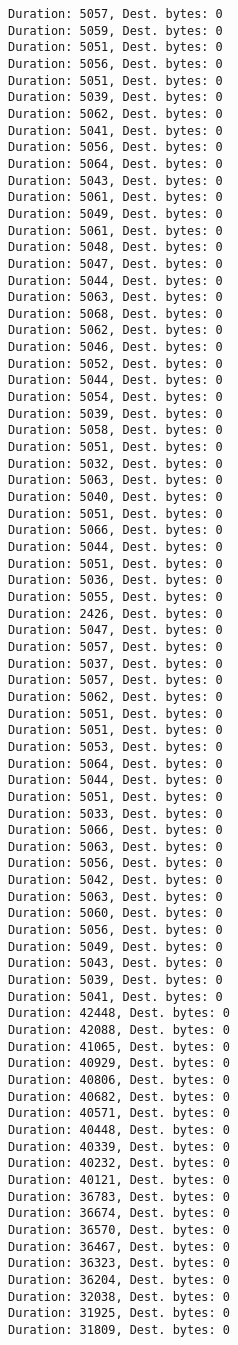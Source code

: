 \documentclass[11pt]{article}
\begin{document}
    \begin{Verbatim}[commandchars=\\\{\}]
Duration: 5057, Dest. bytes: 0
Duration: 5059, Dest. bytes: 0
Duration: 5051, Dest. bytes: 0
Duration: 5056, Dest. bytes: 0
Duration: 5051, Dest. bytes: 0
Duration: 5039, Dest. bytes: 0
Duration: 5062, Dest. bytes: 0
Duration: 5041, Dest. bytes: 0
Duration: 5056, Dest. bytes: 0
Duration: 5064, Dest. bytes: 0
Duration: 5043, Dest. bytes: 0
Duration: 5061, Dest. bytes: 0
Duration: 5049, Dest. bytes: 0
Duration: 5061, Dest. bytes: 0
Duration: 5048, Dest. bytes: 0
Duration: 5047, Dest. bytes: 0
Duration: 5044, Dest. bytes: 0
Duration: 5063, Dest. bytes: 0
Duration: 5068, Dest. bytes: 0
Duration: 5062, Dest. bytes: 0
Duration: 5046, Dest. bytes: 0
Duration: 5052, Dest. bytes: 0
Duration: 5044, Dest. bytes: 0
Duration: 5054, Dest. bytes: 0
Duration: 5039, Dest. bytes: 0
Duration: 5058, Dest. bytes: 0
Duration: 5051, Dest. bytes: 0
Duration: 5032, Dest. bytes: 0
Duration: 5063, Dest. bytes: 0
Duration: 5040, Dest. bytes: 0
Duration: 5051, Dest. bytes: 0
Duration: 5066, Dest. bytes: 0
Duration: 5044, Dest. bytes: 0
Duration: 5051, Dest. bytes: 0
Duration: 5036, Dest. bytes: 0
Duration: 5055, Dest. bytes: 0
Duration: 2426, Dest. bytes: 0
Duration: 5047, Dest. bytes: 0
Duration: 5057, Dest. bytes: 0
Duration: 5037, Dest. bytes: 0
Duration: 5057, Dest. bytes: 0
Duration: 5062, Dest. bytes: 0
Duration: 5051, Dest. bytes: 0
Duration: 5051, Dest. bytes: 0
Duration: 5053, Dest. bytes: 0
Duration: 5064, Dest. bytes: 0
Duration: 5044, Dest. bytes: 0
Duration: 5051, Dest. bytes: 0
Duration: 5033, Dest. bytes: 0
Duration: 5066, Dest. bytes: 0
Duration: 5063, Dest. bytes: 0
Duration: 5056, Dest. bytes: 0
Duration: 5042, Dest. bytes: 0
Duration: 5063, Dest. bytes: 0
Duration: 5060, Dest. bytes: 0
Duration: 5056, Dest. bytes: 0
Duration: 5049, Dest. bytes: 0
Duration: 5043, Dest. bytes: 0
Duration: 5039, Dest. bytes: 0
Duration: 5041, Dest. bytes: 0
Duration: 42448, Dest. bytes: 0
Duration: 42088, Dest. bytes: 0
Duration: 41065, Dest. bytes: 0
Duration: 40929, Dest. bytes: 0
Duration: 40806, Dest. bytes: 0
Duration: 40682, Dest. bytes: 0
Duration: 40571, Dest. bytes: 0
Duration: 40448, Dest. bytes: 0
Duration: 40339, Dest. bytes: 0
Duration: 40232, Dest. bytes: 0
Duration: 40121, Dest. bytes: 0
Duration: 36783, Dest. bytes: 0
Duration: 36674, Dest. bytes: 0
Duration: 36570, Dest. bytes: 0
Duration: 36467, Dest. bytes: 0
Duration: 36323, Dest. bytes: 0
Duration: 36204, Dest. bytes: 0
Duration: 32038, Dest. bytes: 0
Duration: 31925, Dest. bytes: 0
Duration: 31809, Dest. bytes: 0

\end{Verbatim}
\end{document}
